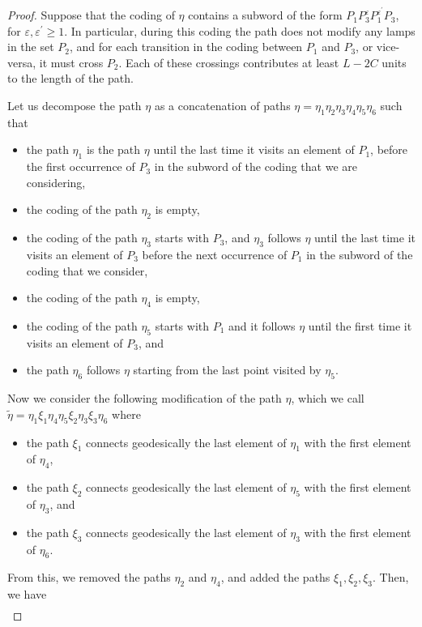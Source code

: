 \begin{proof}
	Suppose that the coding of $\eta$ contains a subword of the form $P_1P_3^{\varepsilon}P_1^{\varepsilon^{\prime }}P_3$, for $\varepsilon, \varepsilon^{\prime}\ge 1$. In particular, during this coding the path does not modify any lamps in the set $P_2$, and for each transition in the coding between $P_1$ and $P_3$, or vice-versa, it must cross $P_2$. Each of these crossings contributes at least $L-2C$ units to the length of the path.
	
Let us decompose the path $\eta$ as a concatenation of paths $\eta=\eta_1\eta_2\eta_3\eta_4\eta_5\eta_6$ such that
\begin{itemize}
	\item the path $\eta_1$ is the path $\eta$ until the last time it visits an element of $P_1$, before the first occurrence of $P_3$ in the subword of the coding that we are considering,
	\item the coding of the path $\eta_2$ is empty,
	\item the coding of the path $\eta_3$ starts with $P_3$, and $\eta_3$ follows $\eta$ until the last time it visits an element of $P_3$ before the next occurrence of $P_1$ in the subword of the coding that we consider,
	\item the coding of the path $\eta_4$ is empty, 
	\item the coding of the path $\eta_5$ starts with $P_1$ and it follows $\eta$ until the first time it visits an element of $P_3$, and
	\item the path $\eta_6$ follows $\eta$ starting from the last point visited by $\eta_5$.
\end{itemize}
	Now we consider the following modification of the path $\eta$, which we call $\widetilde{\eta}=\eta_1\xi_1 \eta_4 \eta_5 \xi_2 \eta_3 \xi_3 \eta_6$ where
	\begin{itemize}
		\item the path $\xi_1$ connects geodesically the last element of $\eta_1$ with the first element of $\eta_4$,
		\item the path $\xi_2$ connects geodesically the last element of $\eta_5$ with the first element of $\eta_3$, and
		\item the path $\xi_3$ connects geodesically the last element of $\eta_3$ with the first element of $\eta_6$.
	\end{itemize}
	From this, we removed the paths $\eta_2$ and $\eta_4$, and added the paths $\xi_1,\xi_2,\xi_3$. Then, we have
	\begin{align*}

\end{align*}
\end{proof}
